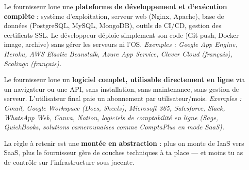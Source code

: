 \documentclass[11pt]{article}
\begin{document}
\begin{definition}
Le fournisseur loue une \textbf{plateforme de développement et d'exécution complète} : système d'exploitation, serveur web (Nginx, Apache), base de données (PostgreSQL, MySQL, MongoDB), outils de CI/CD, gestion des certificats SSL. Le développeur déploie simplement son code (Git push, Docker image, archive) sans gérer les serveurs ni l'OS. \emph{Exemples : Google App Engine, Heroku, AWS Elastic Beanstalk, Azure App Service, Clever Cloud (français), Scalingo (français).}
\end{definition}

\begin{definition}
Le fournisseur loue un \textbf{logiciel complet, utilisable directement en ligne} via un navigateur ou une API, sans installation, sans maintenance, sans gestion de serveur. L'utilisateur final paie un abonnement par utilisateur/mois. \emph{Exemples : Gmail, Google Workspace (Docs, Sheets), Microsoft 365, Salesforce, Slack, WhatsApp Web, Canva, Notion, logiciels de comptabilité en ligne (Sage, QuickBooks, solutions camerounaises comme \emph{ComptaPlus} en mode SaaS).}
\end{definition}

La règle à retenir est une \textbf{montée en abstraction} : plus on monte de IaaS vers SaaS, plus le fournisseur gère de couches techniques à ta place — et moins tu as de contrôle sur l'infrastructure sous-jacente.
\end{document}
